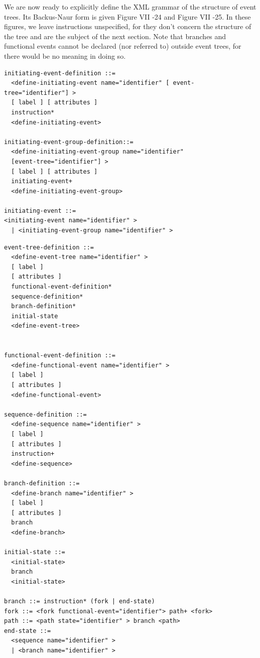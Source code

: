 \documentclass[11pt]{article}
\begin{document}
We are now ready to explicitly define the XML grammar of the structure
of event trees. Its Backus-Naur form is given Figure VII -24 and Figure
VII -25. In these figures, we leave instructions unspecified, for they
don't concern the structure of the tree and are the subject of the next
section. Note that branches and functional events cannot be declared
(nor referred to) outside event trees, for there would be no meaning in
doing so.

\begin{lstlisting}
initiating-event-definition ::=
  <define-initiating-event name="identifier" [ event-tree="identifier"] >
  [ label ] [ attributes ]
  instruction*
  <define-initiating-event>

initiating-event-group-definition::=
  <define-initiating-event-group name="identifier"
  [event-tree="identifier"] >
  [ label ] [ attributes ]
  initiating-event+
  <define-initiating-event-group>

initiating-event ::=
<initiating-event name="identifier" >
  | <initiating-event-group name="identifier" >
\end{lstlisting}



\begin{lstlisting}
event-tree-definition ::=
  <define-event-tree name="identifier" >
  [ label ]
  [ attributes ]
  functional-event-definition*
  sequence-definition*
  branch-definition*
  initial-state
  <define-event-tree>


functional-event-definition ::=
  <define-functional-event name="identifier" >
  [ label ]
  [ attributes ]
  <define-functional-event>

sequence-definition ::=
  <define-sequence name="identifier" >
  [ label ]
  [ attributes ]
  instruction+
  <define-sequence>

branch-definition ::=
  <define-branch name="identifier" >
  [ label ]
  [ attributes ]
  branch
  <define-branch>

initial-state ::=
  <initial-state>
  branch
  <initial-state>

branch ::= instruction* (fork | end-state)
fork ::= <fork functional-event="identifier"> path+ <fork>
path ::= <path state="identifier" > branch <path>
end-state ::=
  <sequence name="identifier" >
  | <branch name="identifier" >
\end{lstlisting}
\end{document}
